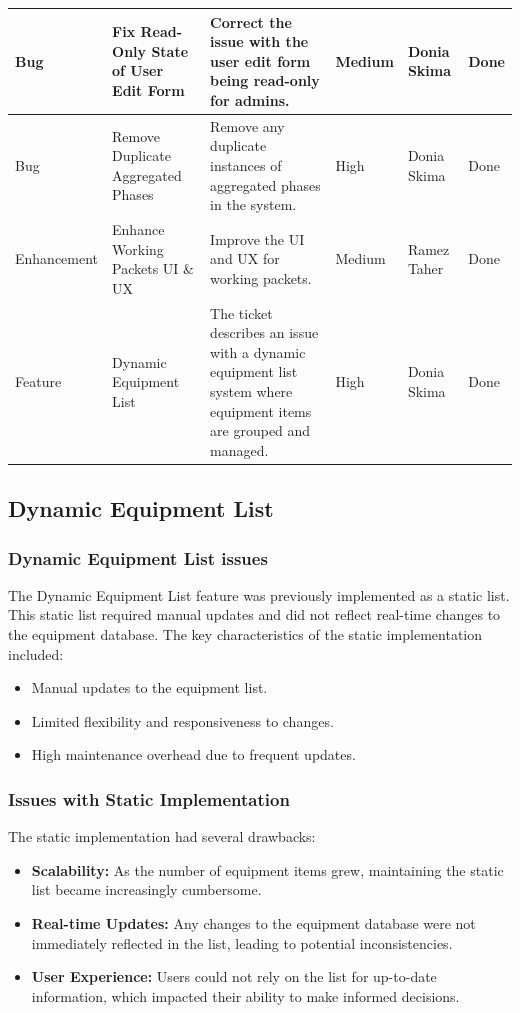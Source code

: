 \begin{longtable}{|p{2.5cm}|p{2cm}|p{2.75cm}|p{1.75cm}|p{1.75cm}|p{1.25cm}|}
    \hline
    Bug & Fix Read-Only State of User Edit Form & Correct the issue with the user edit form being read-only for admins. & Medium & Donia Skima & Done \\
    \hline
    Bug & Remove Duplicate Aggregated Phases & Remove any duplicate instances of aggregated phases in the system. & High & Donia Skima & Done \\
    \hline
    Enhancement & Enhance Working Packets UI \& UX & Improve the UI and UX for working packets. & Medium & Ramez Taher & Done \\
    \hline
    Feature & Dynamic Equipment List & The ticket describes an issue with a dynamic equipment list system where equipment items are grouped and managed. & High & Donia Skima & Done \\
    \hline
    \end{longtable}
    \subsection{Dynamic Equipment List}
    \subsubsection{Dynamic Equipment List issues}
    The Dynamic Equipment List feature was previously implemented as a static list. This static list required manual updates and did not reflect real-time changes to the equipment database. The key characteristics of the static implementation included:
    \begin{itemize}
        \item Manual updates to the equipment list.
        \item Limited flexibility and responsiveness to changes.
        \item High maintenance overhead due to frequent updates.
    \end{itemize}
    
    \subsubsection{Issues with Static Implementation}
    The static implementation had several drawbacks:
    \begin{itemize}
        \item \textbf{Scalability:} As the number of equipment items grew, maintaining the static list became increasingly cumbersome.
        \item \textbf{Real-time Updates:} Any changes to the equipment database were not immediately reflected in the list, leading to potential inconsistencies.
        \item \textbf{User Experience:} Users could not rely on the list for up-to-date information, which impacted their ability to make informed decisions.
    \end{itemize}
    
